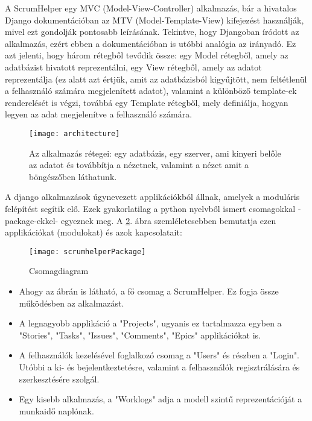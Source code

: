 A ScrumHelper egy MVC (Model-View-Controller) alkalmazás, bár a hivatalos Django dokumentációban az MTV (Model-Template-View) kifejezést használják, mivel ezt gondolják pontosabb leírásának. Tekintve, hogy Djangoban íródott az alkalmazás, ezért ebben a dokumentációban is utóbbi analógia az irányadó. Ez azt jelenti, hogy három rétegből tevődik össze: egy Model rétegből, amely az adatbázist hivatott reprezentálni, egy View rétegből, amely az adatot reprezentálja (ez alatt azt értjük, amit az adatbázisból kigyűjtött, nem feltétlenül a felhasználó számára megjelenített adatot), valamint a különböző template-ek renderelését is végzi, továbbá egy Template rétegből, mely definiálja, hogyan legyen az adat megjelenítve a felhasználó számára.

\begin{figure}[H]
	\centering
	\texttt{[image: architecture]}
	\caption{Az alkalmazás rétegei: egy adatbázis, egy szerver, ami kinyeri belőle az adatot és továbbítja a nézetnek, valamint a nézet amit a böngészőben láthatunk.}
	\label{fig:architecture}
\end{figure}

A django alkalmazások úgynevezett applikációkból állnak, amelyek a moduláris felépítést segítik elő. Ezek gyakorlatilag a python nyelvből ismert csomagokkal -package-ekkel- egyeznek meg. A \ref{fig:packages}. ábra szemléletesebben bemutatja ezen applikációkat (modulokat) és azok kapcsolatait:

\begin{figure}[H]
	\centering
	\texttt{[image: scrumhelperPackage]}
	\caption{Csomagdiagram}
	\label{fig:packages}
\end{figure}

\pagebreak

\begin{itemize}
 	\item Ahogy az ábrán is látható, a fő csomag a ScrumHelper. Ez fogja össze működésben az alkalmazást.
	\item A legnagyobb applikáció a "Projects", ugyanis ez tartalmazza egyben a "Stories", "Tasks", "Issues", "Comments", "Epics" applikációkat is.
	\item A felhasználók kezelésével foglalkozó csomag a "Users" és részben a "Login". Utóbbi a ki- és bejelentkeztetésre, valamint a felhasználók regisztrálására és szerkesztésére szolgál.
	\item Egy kisebb alkalmazás, a "Worklogs" adja a modell szintű reprezentációját a munkaidő naplónak.
\end{itemize}

